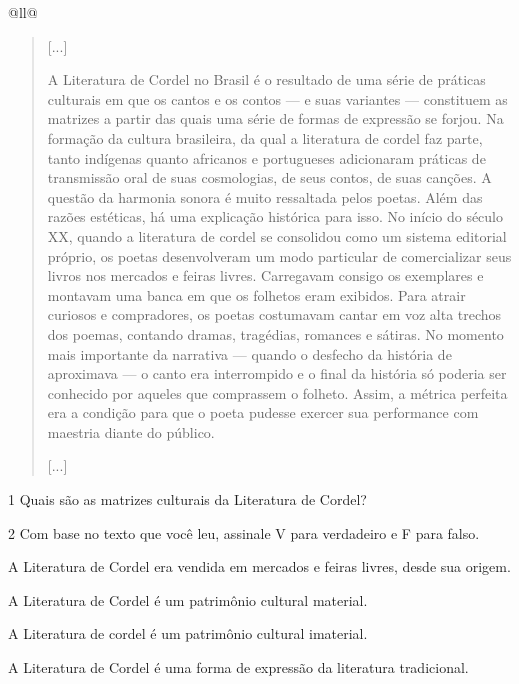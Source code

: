 \begin{itemize}
\begin{itemize}
\begin{escolha}[]{@{}ll@{}}
\begin{quote}
{[}...{]}

A Literatura de Cordel no Brasil é o resultado de uma série de
práticas culturais em que os cantos e os contos --- e suas variantes ---
constituem as matrizes a partir das quais uma série de formas de
expressão se forjou. Na formação da cultura brasileira, da qual a
literatura de cordel faz parte, tanto indígenas quanto africanos e
portugueses adicionaram práticas de transmissão oral de suas
cosmologias, de seus contos, de suas canções. A questão da harmonia
sonora é muito ressaltada pelos poetas. Além das razões estéticas, há
uma explicação histórica para isso. No início do século XX, quando a
literatura de cordel se consolidou como um sistema editorial próprio, os
poetas desenvolveram um modo particular de comercializar seus livros nos
mercados e feiras livres. Carregavam consigo os exemplares e montavam
uma banca em que os folhetos eram exibidos. Para atrair curiosos e
compradores, os poetas costumavam cantar em voz alta trechos dos poemas,
contando dramas, tragédias, romances e sátiras. No momento mais
importante da narrativa --- quando o desfecho da história de aproximava
--- o canto era interrompido e o final da história só poderia ser
conhecido por aqueles que comprassem o folheto. Assim, a métrica
perfeita era a condição para que o poeta pudesse exercer sua performance
com maestria diante do público.

{[}...{]}

\end{quote}

\num{1}  Quais são as matrizes culturais da Literatura de Cordel?


\num{2}  Com base no texto que você leu, assinale V para verdadeiro e F para falso.

\begin{boxlist}
\item A Literatura de Cordel era vendida em mercados e feiras livres, desde sua origem.
\item A Literatura de Cordel é um patrimônio cultural material.
\item A Literatura de cordel é um patrimônio cultural imaterial.
\item A Literatura de Cordel é uma forma de expressão da literatura tradicional.
\end{boxlist}


\end{escolha}
\end{itemize}
\end{itemize}
